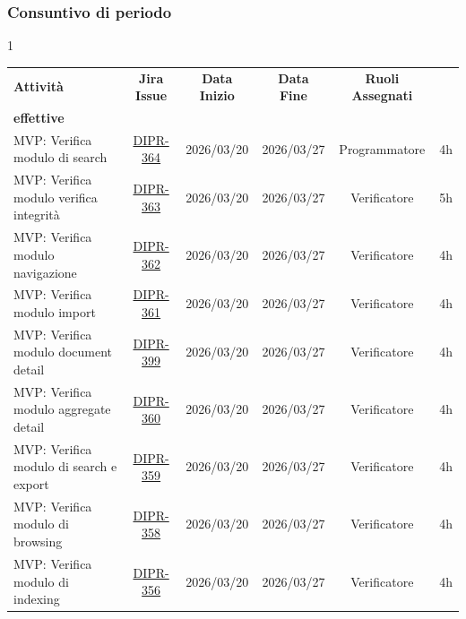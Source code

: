\documentclass[a4paper,12pt]{article}
\begin{document}
\subsubsection{Consuntivo di periodo}
\begin{spacing}{1}
    \small
\begin{longtable}{|p{4cm}|c|c|c|c|c|}
        \hline
        \rowcolor{zpusgreen!30}
        \textbf{Attività} & \textbf{Jira Issue} & \textbf{Data Inizio} & \textbf{Data Fine} & \textbf{Ruoli Assegnati} & \begin{tabular}[c]{@{}c@{}} \textbf{Ore} \\ \textbf{effettive} \end{tabular} \\
        \hline
        [BACKEND] MVP: Verifica modulo di search & \href{https://7zpus.atlassian.net/browse/DIPR-364}{DIPR-364} & 2026/03/20 & 2026/03/27 & Programmatore & 4h \\
        \hline
        [FRONTEND] MVP: Verifica modulo verifica integrità & \href{https://7zpus.atlassian.net/browse/DIPR-363}{DIPR-363} & 2026/03/20 & 2026/03/27 & Verificatore & 5h \\
        \hline
        [FRONTEND] MVP: Verifica modulo navigazione & \href{https://7zpus.atlassian.net/browse/DIPR-362}{DIPR-362} & 2026/03/20 & 2026/03/27 & Verificatore & 4h \\
        \hline
        [FRONTEND] MVP: Verifica modulo import & \href{https://7zpus.atlassian.net/browse/DIPR-361}{DIPR-361} & 2026/03/20 & 2026/03/27 & Verificatore & 4h \\
        \hline
        [FRONTEND] MVP: Verifica modulo document detail & \href{https://7zpus.atlassian.net/browse/DIPR-399}{DIPR-399} & 2026/03/20 & 2026/03/27 & Verificatore & 4h \\
        \hline
        [FRONTEND] MVP: Verifica modulo aggregate detail& \href{https://7zpus.atlassian.net/browse/DIPR-360}{DIPR-360} & 2026/03/20 & 2026/03/27 & Verificatore & 4h \\
        \hline
        [BACKEND] MVP: Verifica modulo di search e export & \href{https://7zpus.atlassian.net/browse/DIPR-359}{DIPR-359} & 2026/03/20 & 2026/03/27 & Verificatore & 4h \\
        \hline
        [BACKEND] MVP: Verifica modulo di browsing & \href{https://7zpus.atlassian.net/browse/DIPR-358}{DIPR-358} & 2026/03/20 & 2026/03/27 & Verificatore & 4h \\
        \hline
        [BACKEND] MVP: Verifica modulo di indexing & \href{https://7zpus.atlassian.net/browse/DIPR-356}{DIPR-356} & 2026/03/20 & 2026/03/27 & Verificatore & 4h \\

\end{longtable}
\end{spacing}
\end{document}
